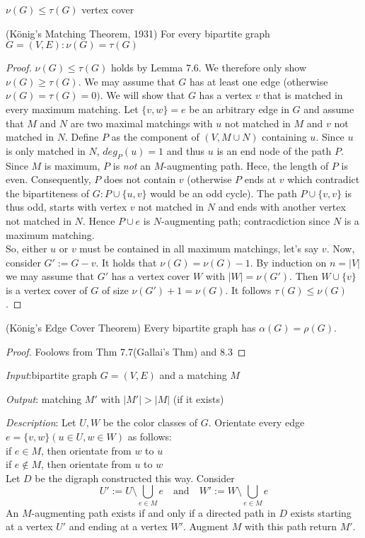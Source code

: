 $\nu(G) \leq \tau(G)$ vertex cover 
\begin{thm}(König's Matching Theorem, 1931)
For every bipartite graph $G=(V,E): \nu(G)=\tau(G)$ 
\end{thm}
\begin{proof} $\nu(G) \leq \tau(G)$ holds by Lemma 7.6. %
We therefore only show $\nu(G) \geq \tau(G)$.
We may assume that $G$ has at least one edge (otherwise $\nu(G)=\tau(G)=0).$ We will show that $G$ has a vertex $v$ that is matched in every maximum matching. Let $\{v,w\}=e$ be an arbitrary edge in $G$ and assume that $M$ and $N$ are two maximal matchings with $u$ not matched in $M$ and $v$ not matched in $N$. Define $P$ as the component of $(V,M \cup N)$ containing $u$.
Since $u$ is only matched in $N$, $deg_P(u)=1$ and thus $u$ is an end node of the path $P$. Since $M$ is maximum, $P$ is \emph{not} an $M$-augmenting path. Hece, the length of $P$ is even. Consequently, $P$ does not contain $v$ (otherwise $P$ ends at $v$ which contradict the bipartiteness of $G:P\cup \{u,v\}$ would be an odd cycle).
The path $P \cup \{v,v\}$ is thus odd, starts with vertex $v$ not matched in $N$ and ends with another vertex not matched in $N$. Hence $P \cup e$ is $N$-augmenting path; contracdiction since $N$ is a maximum matching.\\
So, either $u$ or $v$ must be contained in all maximum matchings, let's say $v$. Now, consider $G':=G-v$. It holds that $\nu(G)=\nu(G)-1$. By induction on $n=|V|$ we may assume that $G'$ has a vertex cover $W$ with $|W|=\nu(G')$. Then $W \cup \{v\}$ is a vertex cover of $G$ of size $\nu(G')+1=\nu(G)$. It follows $\tau(G)\leq \nu(G)$.
\end{proof}

\begin{cor}(König's Edge Cover Theorem)
Every bipartite graph has $\alpha(G)=\rho(G)$.
\end{cor}
\begin{proof}
Foolows from Thm 7.7(Gallai's Thm) and 8.3 %
\end{proof}


\emph{Input}:bipartite graph $G=(V,E)$ and a matching $M$

\emph{Output}: matching $M'$ with $|M'| > |M|$ (if it exists)

\emph{Description}: Let $U,W$ be the color classes of $G$. Orientate every edge $e=\{v,w\} (u \in U, w \in W)$ as follows: \\
if $e \in M$, then orientate from $w$ to $u$ \\
if $e \notin M$, then orientate from $u$ to $w$ \\
Let $D$ be the digraph constructed this way. Consider \[ U':=U \setminus \bigcup\limits_{e \in M}e \quad \text{and} \quad W':=W \setminus \bigcup\limits_{e \in M}e \]An $M$-augmenting path exists if and only if a directed path in $D$ exists starting at a vertex $U'$ and ending at a vertex $W'$. Augment $M$ with this path return $M'$.

